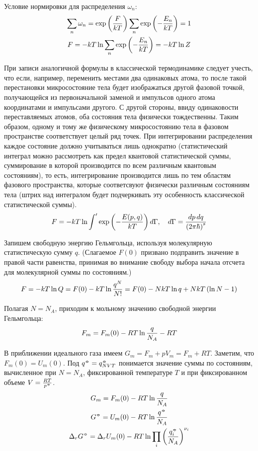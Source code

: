 Условие нормировки для распределения $\omega_n$:
\vverh
\begin{gather}
	\sum_n \omega_n = \exp \left( \frac{F}{kT} \right) \sum_n \exp \left( - \frac{E_n}{kT} \right) = 1 \notag \\
	F = - kT \ln \sum_n \exp \left( - \frac{E_n}{kT} \right) = - kT \ln Z \notag
\end{gather}

При записи аналогичной формулы в классической термодинамике следует учесть, что если, например, переменить местами два одинаковых атома, то после такой перестановки микросостояние тела будет изображаться другой фазовой точкой, получающейся из первоначальной заменой и импульсов одного атома координатами и импульсами другого. С другой стороны, ввиду одинаковости переставляемых атомов, оба состояния тела физически тождественны. Таким образом, одному и тому же физическому микросостоянию тела в фазовом пространстве соответствует целый ряд точек. При интегрировании распределения каждое состояние должно учитываться лишь однократно (статистический интеграл можно рассмотреть как предел квантовой статистической суммы, суммирование в которой производится по всем различным квантовым состояниям), то есть, интегрирование производится лишь по тем областям фазового пространства, которые соответсвуют физически различным состояниям тела (штрих над интегралом будет подчеркивать эту особенность классической статистической суммы).
\vverh
\begin{gather}
	F = -k T \ln \int^{\prime} \exp \left( - \frac{E(p, q)}{kT} \right) d \Gamma, \quad d \Gamma = \frac{dp \, dq}{\left( 2 \pi \hbar \right)^s} \notag
\end{gather}

Запишем свободную энергию Гельмгольца, используя молекулярную статистическую сумму $q$. (Слагаемое $F(0)$ призвано подправить значение в правой части равенства, принимая во внимание свободу выбора начала отсчета для молекулярной суммы по состояниям.)  
\vverh
\begin{gather}
	F = - k T \ln Q = F(0) - kT \ln \frac{q^N}{N!} = F(0) - NkT \ln q + NkT \left( \ln N - 1 \right) \notag 
\end{gather}

Полагая $N = N_A$, приходим к мольному значению свободной энергии Гельмгольца:
\vverh
\begin{gather}
	F_m = F_m(0) - RT \ln \frac{q}{N_A} - RT \notag
\end{gather}

В приближении идеального газа имеем $G_m = F_m + p V_m = F_m + RT$. Заметим, что $F_m(0) = U_m(0)$. Под $q^{\barcirc} = q_{NVT}^{\barcirc}$ понимается значение суммы по состояниям, вычисленное при $N = N_A$, фиксированной температуре $T$ и при фиксированном объеме $V = \frac{RT}{p^{\barcirc}}$.
\vverh
\begin{gather} 
	G_m = F_m(0) - RT \ln \frac{q}{N_A} \notag \\
	G^{\barcirc} = U_m(0) - RT \ln \frac{q^{\barcirc}}{N_A} \notag \\
	\Delta_r G^{\barcirc} = \Delta_r U_m(0) - RT \ln \prod_{i} \lb \frac{q_i^{\barcirc}}{N_A} \rb ^{\nu_i} \notag
\end{gather}

